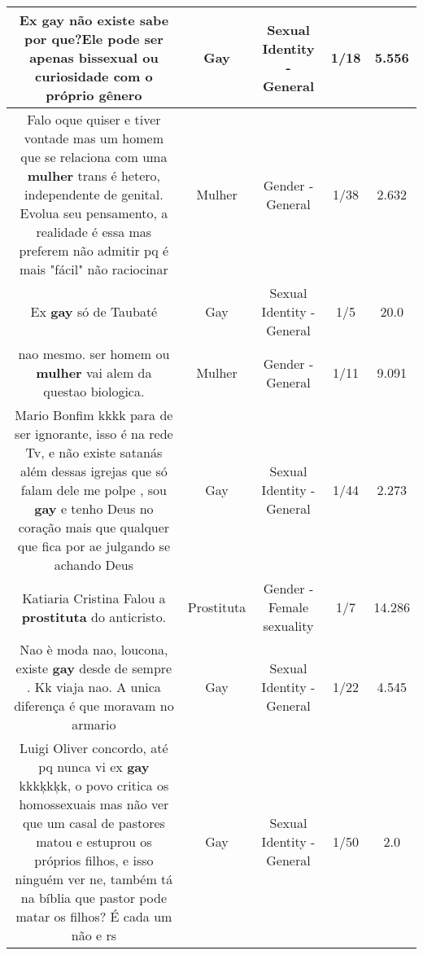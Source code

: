 \documentclass[11pt]{article}
\newlength\mylength
\begin{document}
\begin{center}
\begin{longtable}{|C{.65\mylength}|C{.30\mylength}|C{.12\mylength}|C{.12\mylength}|C{.12\mylength}|}
  \small Ex \textbf{gay} não existe sabe por que?Ele pode ser apenas bissexual ou curiosidade com o próprio gênero\normalsize   & Gay & Sexual Identity - General & 1/18 & 5.556 \\  \hline
  \small Falo oque quiser e tiver vontade mas um homem que se relaciona com uma \textbf{mulher} trans é hetero, independente de genital. Evolua seu pensamento, a realidade é essa mas preferem não admitir pq é mais "fácil" não raciocinar\normalsize   & Mulher & Gender - General & 1/38 & 2.632 \\  \hline
  \small Ex \textbf{gay} só de Taubaté\normalsize   & Gay & Sexual Identity - General & 1/5 & 20.0 \\  \hline
  \small nao mesmo. ser homem ou \textbf{mulher} vai alem da questao biologica.\normalsize   & Mulher & Gender - General & 1/11 & 9.091 \\  \hline
  \small Mario Bonfim kkkk para de ser ignorante, isso é na rede Tv, e não existe satanás além dessas igrejas que só falam dele me polpe , sou \textbf{gay} e tenho Deus no coração mais que qualquer que fica por ae julgando se achando Deus\normalsize   & Gay & Sexual Identity - General & 1/44 & 2.273 \\  \hline
  \small Katiaria Cristina Falou a \textbf{prostituta} do anticristo.\normalsize   & Prostituta & Gender - Female sexuality & 1/7 & 14.286 \\  \hline
  \small Nao è moda nao, loucona, existe \textbf{gay} desde de sempre . Kk viaja nao. A unica diferença é que moravam no armario\normalsize   & Gay & Sexual Identity - General & 1/22 & 4.545 \\  \hline
  \small Luigi Oliver concordo, até pq nunca vi ex \textbf{gay} kkkķkķk,  o povo critica os homossexuais  mas não ver que um casal de pastores matou e estuprou  os próprios filhos, e isso ninguém ver ne, também tá na bíblia que pastor pode matar os filhos? É cada um não e rs\normalsize   & Gay & Sexual Identity - General & 1/50 & 2.0 \\  \hline

\end{longtable}
\end{center}
\end{document}
